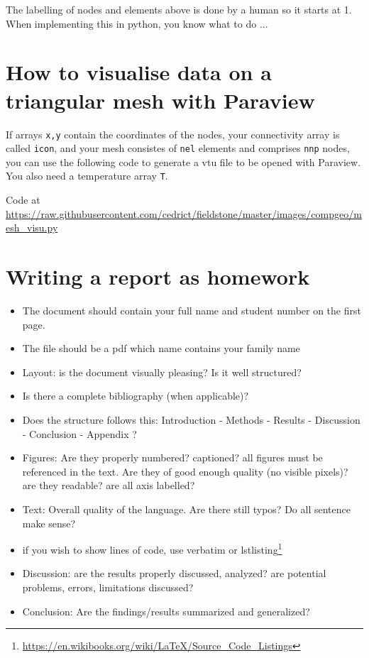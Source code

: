 The labelling of nodes and elements above is done by a human so it starts at 1. When 
implementing this in python, you know what to do ...


\section{How to visualise data on a triangular mesh with Paraview}

If arrays {\tt x,y} contain the coordinates of the nodes, your connectivity array is called {\tt icon},
and your mesh consistes of {\tt nel} elements and comprises {\tt nnp} nodes, you can use the following code
to generate a vtu file to be opened with Paraview. You also need a temperature array {\tt T}.

\begin{center}
Code at \url{https://raw.githubusercontent.com/cedrict/fieldstone/master/images/compgeo/mesh_visu.py}
\end{center}




\section{Writing a report as homework \label{app:grading}} 

\begin{itemize}
\item 
The document should contain your full name and student number on the first page. 
\item 
The file should be a pdf which name contains your family name
\item 
Layout: is the document visually pleasing? Is it well structured? 
\item Is there a complete bibliography (when applicable)?
\item Does the structure follows this: Introduction - Methods - Results - Discussion - Conclusion - Appendix ?
\item 
Figures: Are they properly numbered? captioned? all figures must be referenced in the text. 
Are they of good enough quality (no visible pixels)? are they readable? are all axis labelled?
\item 
Text: Overall quality of the language. Are there still typos? Do all sentence make sense?
\item if you wish to show lines of code, use verbatim or lstlisting\footnote{\url{https://en.wikibooks.org/wiki/LaTeX/Source_Code_Listings}} 
\item 
Discussion: are the results properly discussed, analyzed? are potential problems, errors, limitations discussed?
\item 
Conclusion: Are the findings/results summarized and generalized?
\end{itemize}

